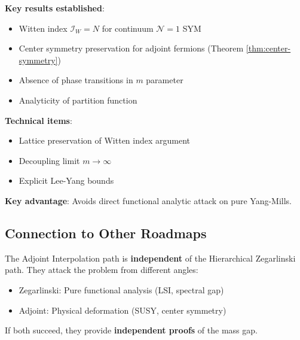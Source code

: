 \begin{summary}
\textbf{Key results established}:
\begin{itemize}
\item Witten index $\mathcal{I}_W = N$ for continuum $\mathcal{N}=1$ SYM
\item Center symmetry preservation for adjoint fermions (Theorem \ref{thm:center-symmetry})
\item Absence of phase transitions in $m$ parameter
\item Analyticity of partition function
\end{itemize}

\textbf{Technical items}:
\begin{itemize}
\item Lattice preservation of Witten index argument
\item Decoupling limit $m \to \infty$
\item Explicit Lee-Yang bounds
\end{itemize}

\textbf{Key advantage}: Avoids direct functional analytic attack on pure Yang-Mills.
\end{summary}

\subsection{Connection to Other Roadmaps}

\begin{remark}[Complementarity]
The Adjoint Interpolation path is \textbf{independent} of the Hierarchical 
Zegarlinski path. They attack the problem from different angles:
\begin{itemize}
\item Zegarlinski: Pure functional analysis (LSI, spectral gap)
\item Adjoint: Physical deformation (SUSY, center symmetry)
\end{itemize}

If both succeed, they provide \textbf{independent proofs} of the mass gap.
\end{remark}






